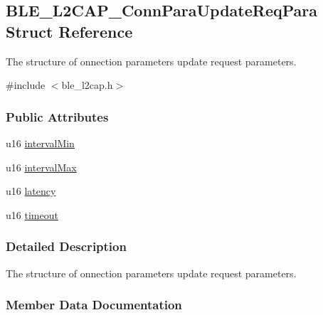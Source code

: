 \hypertarget{struct_b_l_e___l2_c_a_p___conn_para_update_req_para}{}\subsection{B\+L\+E\+\_\+\+L2\+C\+A\+P\+\_\+\+Conn\+Para\+Update\+Req\+Para Struct Reference}
\label{struct_b_l_e___l2_c_a_p___conn_para_update_req_para}


The structure of onnection parameters update request parameters.  




{\ttfamily \#include $<$ble\+\_\+l2cap.\+h$>$}

\subsubsection*{Public Attributes}
\begin{DoxyCompactItemize}
\item 
u16 \hyperlink{struct_b_l_e___l2_c_a_p___conn_para_update_req_para_a5d68968f568c9dd889c252a2a519ae08}{interval\+Min}
\item 
u16 \hyperlink{struct_b_l_e___l2_c_a_p___conn_para_update_req_para_a4dc159075847e60e4a1d9ee650f12326}{interval\+Max}
\item 
u16 \hyperlink{struct_b_l_e___l2_c_a_p___conn_para_update_req_para_a0a016f6d1ea2b4a2f3531b21ee76fe79}{latency}
\item 
u16 \hyperlink{struct_b_l_e___l2_c_a_p___conn_para_update_req_para_a696a87b0588ddf3ca407dd36a1e39fc8}{timeout}
\end{DoxyCompactItemize}


\subsubsection{Detailed Description}
The structure of onnection parameters update request parameters. 

\subsubsection{Member Data Documentation}
